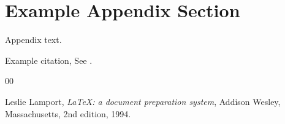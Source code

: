 \documentclass[preprint,12pt]{elsarticle}
\begin{document}
\appendix
\section{Example Appendix Section}
\label{app1}

Appendix text.


Example citation, See \cite{lamport94}.




\begin{thebibliography}{00}


  Leslie Lamport,
  \textit{\LaTeX: a document preparation system},
  Addison Wesley, Massachusetts,
  2nd edition,
  1994.

\end{thebibliography}
\end{document}
